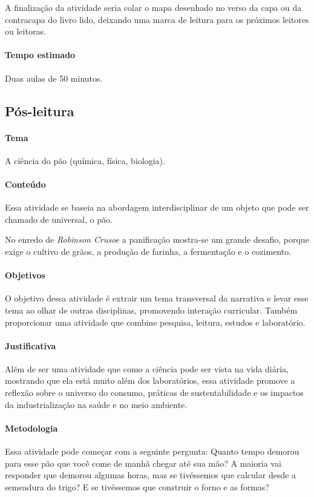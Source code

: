 \documentclass{article}
\begin{document}
A finalização da atividade seria colar o mapa desenhado no verso da capa
ou da contracapa do livro lido, deixando uma marca de leitura para os
próximos leitores ou leitoras.

\paragraph{Tempo estimado} Duas aulas de 50 minutos.

\subsection{Pós-leitura}

\paragraph{Tema} A ciência do pão (química, física, biologia).


\paragraph{Conteúdo}
Essa atividade se baseia na abordagem interdisciplinar de um objeto que
pode ser chamado de universal, o pão.

No enredo de \emph{Robinson Crusoe} a panificação mostra-se um grande
desafio, porque exige o cultivo de grãos, a produção de farinha, a
fermentação e o cozimento.

\paragraph{Objetivos}
O objetivo dessa atividade é extrair um tema transversal da narrativa e
levar esse tema ao olhar de outras disciplinas, promovendo interação
curricular. Também proporcionar uma atividade que combine pesquisa,
leitura, estudos e laboratório.

\paragraph{Justificativa}

Além de ser uma atividade que como a ciência pode ser vista na vida
diária, mostrando que ela está muito além dos laboratórios, essa
atividade promove a reflexão sobre o universo do consumo, práticas de
sustentabilidade e os impactos da industrialização na saúde e no meio
ambiente.

\paragraph{Metodologia}
Essa atividade pode começar com a seguinte pergunta: Quanto tempo
demorou para esse pão que você come de manhã chegar até sua mão? A
maioria vai responder que demorou algumas horas, mas se tivéssemos que
calcular desde a semeadura do trigo? E se tivéssemos que construir o
forno e as formas?
\end{document}
